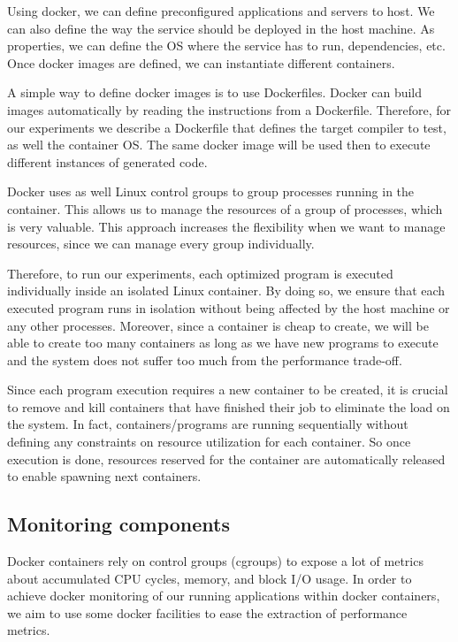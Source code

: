 Using docker, we can define preconfigured applications and servers to host. We can also define the way the service should be deployed in the host machine. 
As properties, we can define the OS where the service has to run, dependencies, etc. Once docker images are defined, we can instantiate different containers.

A simple way to define docker images is to use Dockerfiles. Docker can build images automatically by reading the instructions from a Dockerfile. 
Therefore, for our experiments we describe a Dockerfile that defines the target compiler to test, as well the container OS. The same docker image will be used then to execute different instances of generated code.

Docker uses as well Linux control groups to group processes running in the container. This allows us to manage the resources of a group of processes, which is very valuable. 
This approach increases the flexibility when we want to manage resources, since we can manage every group individually. 

Therefore, to run our experiments, each optimized program is executed individually inside an isolated Linux container. By doing so, we ensure that each executed program runs in isolation without being affected by the host machine or any other processes. Moreover, since a container is cheap to create, we will be able to create too many containers as long as we have new programs to execute and the system does not suffer too much from the performance trade-off.

Since each program execution requires a new container to be created, it is crucial to remove and kill containers that have finished their job to eliminate the load on the system. In fact, containers/programs are running sequentially without defining any constraints on resource utilization for each container. So once execution is done, resources reserved for the container are automatically released to enable spawning next containers.

\subsection{Monitoring components}

Docker containers rely on control groups (cgroups) to expose a lot of metrics about accumulated CPU cycles, memory, and block I/O usage. In order to achieve docker monitoring of our running applications within docker containers, we aim to use some docker facilities to ease the extraction of performance metrics.

